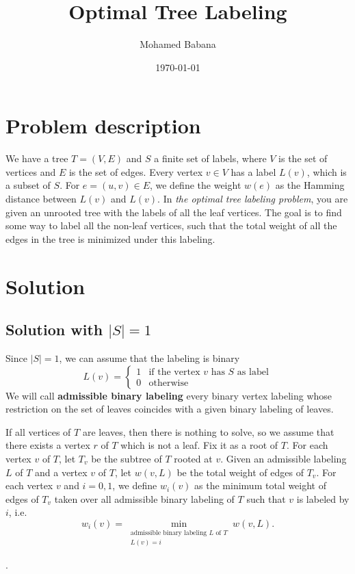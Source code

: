 \documentclass[letterpaper,12pt]{article}
\begin{document}
\title{Optimal Tree Labeling}
\author{Mohamed Babana}
\date{\today}
\maketitle

\section{Problem description}

We have a tree $T = (V, E)$ and $S$ a finite set of labels, where $V$ is the set of vertices and $E$ is the set of edges. Every vertex $v \in V$ has a label $L(v)$, which is a subset of $S$. For $e = (u,v) \in E$, we define the weight $w(e)$ as the Hamming distance between $L(v)$ and $L(v)$. In \textit{the optimal tree labeling problem}, you are given an unrooted tree with the labels of all the leaf vertices. The goal is to find some way to label all the non-leaf vertices, such that        the total weight of all the edges in the tree is minimized under this labeling.

\section{Solution}

\subsection{Solution with \texorpdfstring{$|S| = 1$}{TEXT}}
Since $|S| = 1$, we can assume that the labeling is binary $$L(v) = \left\{\begin{array}{cl}
    1 & \text{if the vertex $v$ has $S$ as label}\\
    0 & \text{otherwise}
\end{array}\right.$$
We will call \textbf{admissible binary labeling} every binary vertex labeling whose restriction on the set of leaves coincides with a given binary labeling of leaves.

If all vertices of $T$ are leaves, then there is nothing to solve, so we assume that there exists a vertex $r$ of $T$ which is not a leaf. Fix it as a root of $T$. For each vertex $v$ of $T$, let $T_v$ be the subtree of $T$ rooted at $v$. Given an admissible labeling $L$ of $T$ and a vertex $v$ of $T$, let $w(v,L)$ be the total weight of edges of $T_v$. For each vertex $v$ and $i = 0,1$, we define $w_i(v)$ as the minimum total weight of edges of $T_v$ taken over all admissible binary labeling of $T$ such that $v$ is labeled by $i$, i.e. $$w_i(v) = \min_{\substack{\text{admissible binary labeling $L$ of $T$} \\ L(v) = i}} w(v, L).$$
\begin{center}
    .
\end{center}
\end{document}
